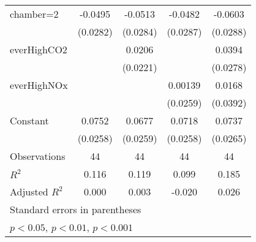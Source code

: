 {\begin{tabular}{l*{4}{c}}
\addlinespace
chamber=2           &     -0.0495         &     -0.0513         &     -0.0482         &     -0.0603\sym{*}  \\
                    &    (0.0282)         &    (0.0284)         &    (0.0287)         &    (0.0288)         \\
\addlinespace
everHighCO2         &                     &      0.0206         &                     &      0.0394         \\
                    &                     &    (0.0221)         &                     &    (0.0278)         \\
\addlinespace
everHighNOx         &                     &                     &     0.00139         &      0.0168         \\
                    &                     &                     &    (0.0259)         &    (0.0392)         \\
\addlinespace
Constant            &      0.0752\sym{**} &      0.0677\sym{*}  &      0.0718\sym{**} &      0.0737\sym{**} \\
                    &    (0.0258)         &    (0.0259)         &    (0.0258)         &    (0.0265)         \\
\midrule
Observations        &          44         &          44         &          44         &          44         \\
\(R^{2}\)           &       0.116         &       0.119         &       0.099         &       0.185         \\
Adjusted \(R^{2}\)  &       0.000         &       0.003         &      -0.020         &       0.026         \\
\bottomrule
\multicolumn{5}{l}{\footnotesize Standard errors in parentheses}\\
\multicolumn{5}{l}{\footnotesize \sym{*} \(p<0.05\), \sym{**} \(p<0.01\), \sym{***} \(p<0.001\)}\\
\end{tabular}
}
